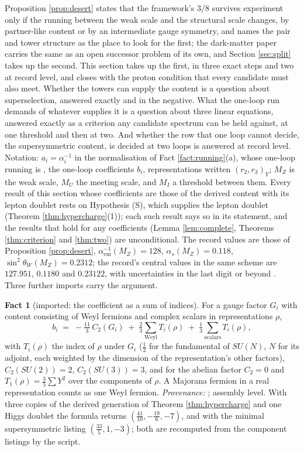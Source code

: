 \documentclass[11pt]{article}
\theoremstyle{definition}
\newtheorem{fact}[theorem]{Fact}
\begin{document}
Proposition \ref{prop:desert} states that the framework's $3/8$ survives experiment only if the running between the weak scale and the structural scale changes, by partner-like content or by an intermediate gauge symmetry, and names the pair and tower structure as the place to look for the first; the dark-matter paper carries the same as an open successor problem of its own, and Section \ref{sec:split} takes up the second. This section takes up the first, in three exact steps and two at record level, and closes with the proton condition that every candidate must also meet. Whether the towers can supply the content is a question about superselection, answered exactly and in the negative. What the one-loop run demands of whatever supplies it is a question about three linear equations, answered exactly as a criterion any candidate spectrum can be held against, at one threshold and then at two. And whether the row that one loop cannot decide, the supersymmetric content, is decided at two loops is answered at record level. Notation: $a_{i} = \alpha_{i}^{-1}$ in the normalisation of Fact \ref{fact:running}(a), whose one-loop running is \cite{GeorgiQuinnWeinberg1974}, the one-loop coefficients $b_{i}$, representations written $(r_{2}, r_{3})_{Y}$; $M_{Z}$ is the weak scale, $M_{U}$ the meeting scale, and $M_{I}$ a threshold between them. Every result of this section whose coefficients are those of the derived content with its lepton doublet rests on Hypothesis (S), which supplies the lepton doublet (Theorem \ref{thm:hypercharge}(1)); each such result says so in its statement, and the results that hold for any coefficients (Lemma \ref{lem:complete}, Theorems \ref{thm:criterion} and \ref{thm:two}) are unconditional. The record values are those of Proposition \ref{prop:desert}, $\alpha_{\mathrm{em}}^{-1}(M_{Z}) = 128$, $\alpha_{s}(M_{Z}) = 0.118$, $\sin^{2}\theta_{W}(M_{Z}) = 0.2312$; the record's central values in the same scheme are $127.951$, $0.1180$ and $0.23122$, with uncertainties in the last digit or beyond \cite{PDG2024}. Three further imports carry the argument.

\begin{fact}[imported: the coefficient as a sum of indices]\label{fact:index}
For a gauge factor $G_{i}$ with content consisting of Weyl fermions and complex scalars in representations $\rho$,
\[
b_{i} \;=\; -\tfrac{11}{3}\,C_{2}(G_{i}) \;+\; \tfrac23 \sum_{\text{Weyl}} T_{i}(\rho) \;+\; \tfrac13 \sum_{\text{scalars}} T_{i}(\rho),
\]
with $T_{i}(\rho)$ the index of $\rho$ under $G_{i}$ ($\tfrac12$ for the fundamental of $SU(N)$, $N$ for its adjoint, each weighted by the dimension of the representation's other factors), $C_{2}(SU(2)) = 2$, $C_{2}(SU(3)) = 3$, and for the abelian factor $C_{2} = 0$ and $T_{1}(\rho) = \tfrac35 \sum Y^{2}$ over the components of $\rho$. A Majorana fermion in a real representation counts as one Weyl fermion. \emph{Provenance:} \cite[Ch.~18]{WeinbergQFT2}; assembly level. With three copies of the derived generation of Theorem \ref{thm:hypercharge} and one Higgs doublet the formula returns $(\tfrac{41}{10}, -\tfrac{19}{6}, -7)$, and with the minimal supersymmetric listing $(\tfrac{33}{5}, 1, -3)$; both are recomputed from the component listings by the script.
\end{fact}
\end{document}
